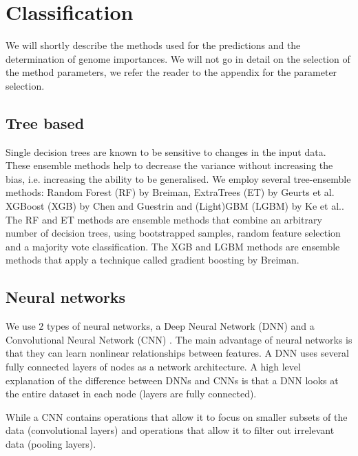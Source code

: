 \documentclass[a4paper,10pt]{article}
\begin{document}
\section{Classification}
%
We will shortly describe the methods used for the predictions and the determination of genome importances.
We will not go in detail on the selection of the method parameters, we refer the reader to the appendix for the
parameter selection.

\subsection{Tree based}

Single decision trees are known to be sensitive to changes in the input data. These ensemble methods 
help to decrease the variance without increasing the bias, i.e. increasing the ability to be generalised.
We employ several tree-ensemble methods: Random Forest (RF) by Breiman\cite{Breiman2001}, ExtraTrees (ET) by Geurts et al.\cite{Geurts2006} 
XGBoost (XGB) by Chen and Guestrin\cite{Chen2016} and (Light)GBM (LGBM) by Ke et al.\cite{Ke2017}.
The RF and ET methods are ensemble methods that combine an arbitrary number of decision trees, using bootstrapped samples,
random feature selection and a majority vote classification. The XGB and LGBM methods are ensemble methods 
that apply a technique called gradient boosting by Breiman\cite{Breiman1997}.
%
\subsection{Neural networks}
%
We use $2$ types of neural networks, a Deep Neural Network (DNN) \cite{lecun2015deep} and a Convolutional Neural Network (CNN) \cite{Lecun98}. 
The main advantage of neural networks is that they can learn nonlinear relationships between features. 
A DNN uses several fully connected layers of nodes as a network architecture. 
A high level explanation of the difference between DNNs and CNNs is that a DNN looks at the entire dataset in each node (layers are fully connected).


While a CNN contains operations that allow it to focus on smaller subsets of the data (convolutional layers) 
and operations that allow it to filter out irrelevant data (pooling layers). 
\end{document}
